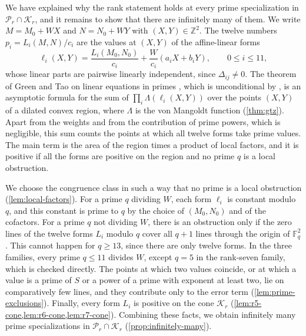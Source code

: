\documentclass[12pt,oneside,openany]{book}
\theoremstyle{definition}
\theoremstyle{plain}
\numberwithin{equation}{chapter}
\theoremstyle{plain}
\theoremstyle{definition}
\theoremstyle{remark}
\newcommand{\Z}{\mathbb Z}
\newcommand{\F}{\mathbb F}
\newcommand{\cP}{\mathcal P}
\newcommand{\cK}{\mathcal K}
\begin{document}
We have explained why the rank statement holds at every prime specialization in $\cP_r\cap\cK_r$, and it remains to show that there are infinitely many of them. We write $M=M_0+WX$ and $N=N_0+WY$ with $(X,Y)\in\Z^2$. The twelve numbers $p_i=L_i(M,N)/c_i$ are the values at $(X,Y)$ of the affine-linear forms
\begin{equation*}
\ell_i(X,Y)=\frac{L_i(M_0,N_0)}{c_i}+\frac W{c_i}(a_iX+b_iY),\qquad0\le i\le11,
\end{equation*}
whose linear parts are pairwise linearly independent, since $\Delta_{ij}\ne0$. The theorem of Green and Tao on linear equations in primes \cite{GT2010}, which is unconditional by \cite{GT2012,GTZ2012}, is an asymptotic formula for the sum of $\prod_i\Lambda(\ell_i(X,Y))$ over the points $(X,Y)$ of a dilated convex region, where $\Lambda$ is the von Mangoldt function (\cref{thm:gtz}). Apart from the weights and from the contribution of prime powers, which is negligible, this sum counts the points at which all twelve forms take prime values. The main term is the area of the region times a product of local factors, and it is positive if all the forms are positive on the region and no prime $q$ is a local obstruction.

We choose the congruence class in such a way that no prime is a local obstruction (\cref{lem:local-factors}). For a prime $q$ dividing $W$, each form $\ell_i$ is constant modulo $q$, and this constant is prime to $q$ by the choice of $(M_0,N_0)$ and of the cofactors. For a prime $q$ not dividing $W$, there is an obstruction only if the zero lines of the twelve forms $L_i$ modulo $q$ cover all $q+1$ lines through the origin of $\F_q^2$. This cannot happen for $q\ge13$, since there are only twelve forms. In the three families, every prime $q\le11$ divides $W$, except $q=5$ in the rank-seven family, which is checked directly. The points at which two values coincide, or at which a value is a prime of $S$ or a power of a prime with exponent at least two, lie on comparatively few lines, and they contribute only to the error term (\cref{lem:prime-exclusions}). Finally, every form $L_i$ is positive on the cone $\cK_r$ (\cref{lem:r5-cone,lem:r6-cone,lem:r7-cone}). Combining these facts, we obtain infinitely many prime specializations in $\cP_r\cap\cK_r$ (\cref{prop:infinitely-many}). 
\end{document}
